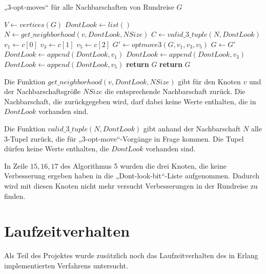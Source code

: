 \begin{algorithm}
  \caption{„3-opt-moves“ für alle Nachbarschaften von Rundreise $G$}\label{alg:ls3opt_run}
\begin{algorithmic}[1]
   
    \State $V \gets vertices(G)$
    \State $DontLook \gets list()$
      \State $N \gets get\_neighborhood(v, DontLook, NSize)$
      \State $C \gets valid\_3\_tuple(N, DontLook)$
        \State $v_1 \gets c[0]$
        \State $v_3 \gets c[1]$
        \State $v_5 \gets c[2]$
        \State $G' \gets optmove3(G, v_1,v_3,v_5)$
          \State $G \gets G'$ 
        \Else
          \State $DontLook \gets append(DontLook, v_1)$ 
          \State $DontLook \gets append(DontLook, v_3)$
          \State $DontLook \gets append(DontLook, v_5)$
        \EndIf
      \EndForeach
        \State \textbf{return} $G$ 
      \EndIf
    \EndForeach
    \State \textbf{return} $G$
  \EndProcedure
\end{algorithmic}
\end{algorithm}

\begin{bem}
  Die Funktion $get\_neighborhood(v, DontLook, NSize)$ gibt für den
  Knoten $v$ und der Nachbarschaftsgröße $NSize$ die entsprechende
  Nachbarschaft zurück. Die Nachbarschaft, die zurückgegeben wird, darf
  dabei keine Werte enthalten, die in $DontLook$ vorhanden sind.
\end{bem}

\begin{bem}
Die Funktion $valid\_3\_tuple(N, DontLook)$ gibt anhand der
  Nachbarschaft $N$ alle 3-Tupel zurück, die für „3-opt-move“-Vorgänge
  in Frage kommen. Die Tupel dürfen keine Werte enthalten, die
  $DontLook$ vorhanden sind.
\end{bem}
In Zeile $15,16,17$ des Algorithmus 5 wurden die drei Knoten, die keine
Verbesserung ergeben haben in die „Dont-look-bit“-Liste aufgenommen.
Dadurch wird mit diesen Knoten nicht mehr versucht Verbesserungen in der
Rundreise zu finden. 
\section{Laufzeitverhalten}
Als Teil des Projektes wurde zusätzlich noch das Laufzeitverhalten des
in Erlang implementierten Verfahrens untersucht. 
